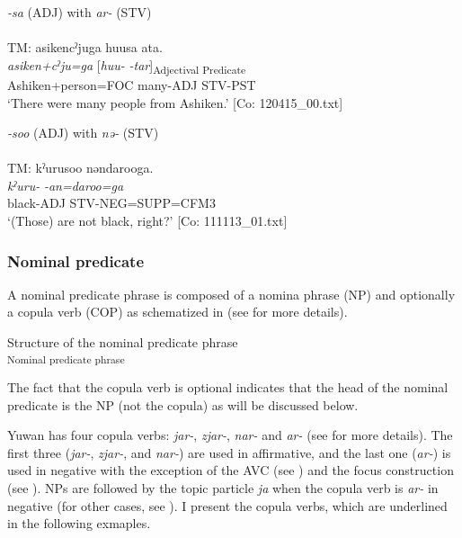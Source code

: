 \ea  \label{ex:4.11}
 \ea \textit{{}-sa} (ADJ) with \textit{ar-} (STV) \label{ex:4.11a}\\\\
\glll  TM:  asikencˀjuga  huusa  ata.\\
    \textit{asiken+cˀju=ga}  [\textit{huu-}  \textit{-tar}]\textsubscript{Adjectival Predicate}\\
    Ashiken+person=FOC  many-ADJ  STV-PST\\
    \glt     ‘There were many people from Ashiken.’ [Co: 120415\_00.txt]

 \ex\textit{{}-soo} (ADJ) with \textit{nə-} (STV)\\\\
\glll  TM:  kˀurusoo  nəndarooga.\\
    \textit{kˀuru-}  \textit{-an=daroo=ga}\\
    black-ADJ  STV-NEG=SUPP=CFM3\\
    \glt     ‘(Those) are not black, right?’ [Co: 111113\_01.txt]
    \z
\z

\subsubsection{Nominal predicate}\label{sec:4.1.3.3}

A nominal predicate phrase is composed of a nomina phrase (NP) and optionally a copula verb (COP) as schematized in  (see  for more details).

\ea  Structure of the nominal predicate phrase \label{ex:4.12}\\\textsubscript{Nominal predicate phrase}
\z

The fact that the copula verb is optional indicates that the head of the nominal predicate is the NP (not the copula) as will be discussed below.

Yuwan has four copula verbs: \textit{jar-}, \textit{zjar-}, \textit{nar-} and \textit{ar-} (see  for more details). The first three (\textit{jar-}, \textit{zjar-}, and \textit{nar-}) are used in affirmative, and the last one (\textit{ar-}) is used in negative with the exception of the AVC (see ) and the focus construction (see ). NPs are followed by the topic particle \textit{ja} when the copula verb is \textit{ar-} in negative (for other cases, see ). I present the copula verbs, which are underlined in the following exmaples.

